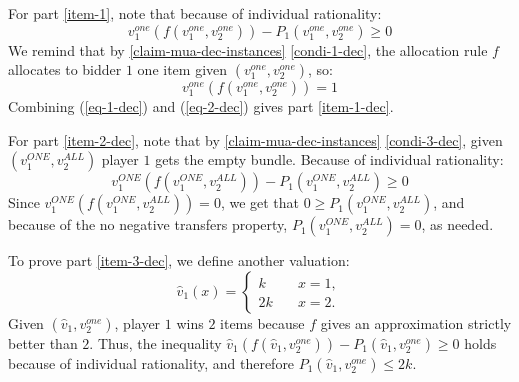 
For part \ref{item-1}, note that because of individual rationality:
\begin{equation}\label{eq-1-dec}
 v_1^{one}(f(v_1^{one},v_2^{one}))-P_1(v_1^{one},v_2^{one})\ge 0   
\end{equation}
We remind that by \cref{claim-mua-dec-instances} \cref{condi-1-dec}, the allocation rule $f$ allocates to bidder $1$ one item given $(v_1^{one},v_2^{one})$, so:
\begin{equation}\label{eq-2-dec}
 v_1^{one}(f(v_1^{one},v_2^{one}))=1   
\end{equation}
Combining (\ref{eq-1-dec}) and (\ref{eq-2-dec}) gives part \ref{item-1-dec}.



For part \ref{item-2-dec}, note that 
by \cref{claim-mua-dec-instances} \cref{condi-3-dec}, 
given $(v_1^{ONE},v_2^{ALL})$ player $1$ gets the empty bundle. Because of individual rationality: 
$$v_1^{ONE}(f(v_1^{ONE},v_2^{ALL}))-P_1(v_1^{ONE},v_2^{ALL})\ge 0 $$
Since $v_1^{ONE}(f(v_1^{ONE},v_2^{ALL}))=0$, we get that $0\ge P_1(v_1^{ONE},v_2^{ALL})$, and because of the no negative transfers property, $P_1(v_1^{ONE},v_2^{ALL})=0$, as needed.  

To prove part \ref{item-3-dec}, we define another valuation:
$$
\hat{v}_1(x)=\begin{cases}
    k \quad &x=1, \\
    2k \quad &x=2.
\end{cases}
$$
Given $(\hat{v}_1,v_2^{one})$, player $1$ wins $2$ items because  
$f$ gives an approximation strictly better than $2$. Thus, the inequality $\hat{v}_1(f(\hat{v}_1,v_2^{one}))-P_1(\hat{v}_1,v_2^{one})\ge 0$ holds because of individual rationality, and therefore $P_1(\hat{v}_1,v_2^{one})\le 2k$. 

